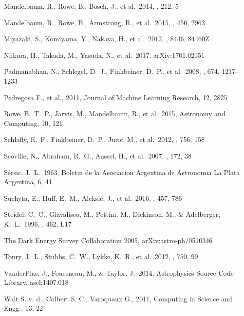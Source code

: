 \documentclass[useamsfonts]{pasj01}
\begin{document}
\begin{thebibliography}{}
     Mandelbaum, R., Rowe, B.,
            Bosch, J., et al.\ 2014, \apjs, 212, 5

     Mandelbaum, R., Rowe, B.,
             Armstrong, R., et al.\ 2015, \mnras, 450, 2963

     Miyazaki, S., Komiyama, Y., Nakaya,
             H., et al.\ 2012, \procspie, 8446, 84460Z

     Niikura, H., Takada, M., Yasuda, N.,
             et al.\ 2017, arXiv:1701.02151

     Padmanabhan, N., Schlegel,
             D.~J., Finkbeiner, D.~P., et al.\ 2008, \apj, 674, 1217-1233

     Pedregosa F., et al., 2011,
             Journal of Machine Learning Research, 12, 2825

     Rowe, B.~T.~P., Jarvis, M., Mandelbaum, R.,
             et al.\ 2015, Astronomy and Computing, 10, 121

     Schlafly, E.~F., Finkbeiner, D.~P.,
             Juri{\'c}, M., et al.\ 2012, \apj, 756, 158

     Scoville, N., Abraham, R.~G.,
             Aussel, H., et al.\ 2007, \apjs, 172, 38

     S{\'e}rsic, J.~L.\ 1963, Boletin de la
             Asociacion Argentina de Astronomia La Plata Argentina, 6, 41

     Suchyta, E., Huff, E.~M., Aleksi{\'c},
             J., et al.\ 2016, \mnras, 457, 786

     Steidel, C.~C., Giavalisco, M.,
             Pettini, M., Dickinson, M., \& Adelberger, K.~L.\ 1996, \apjl, 462, L17

     The Dark Energy
             Survey Collaboration 2005, arXiv:astro-ph/0510346

     Tonry, J.~L., Stubbs, C.~W., Lykke, K.~R.,
             et al.\ 2012, \apj, 750, 99

     VanderPlas, J., Fouesneau, M., \&
             Taylor, J.\ 2014, Astrophysics Source Code Library, ascl:1407.018

     Walt S. v. d., Colbert S. C., Varoquaux G.,
             2011, Computing in Science and Engg., 13, 22

\end{thebibliography}
\end{document}
